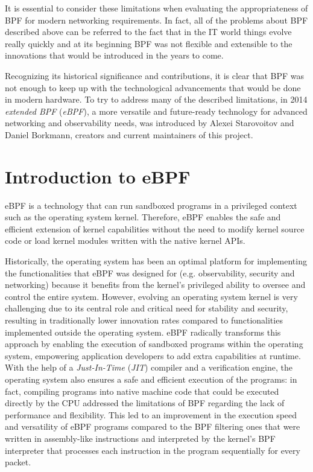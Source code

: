 It is essential to consider these limitations when evaluating the appropriateness of  BPF for modern networking requirements. 
In fact, all of the problems about BPF described above can be referred to the fact that in the IT world things evolve really quickly and at its beginning BPF was not flexible and extensible to the innovations that would be introduced in the years to come.

Recognizing its historical significance and contributions, it is clear that BPF was not enough to keep up with the technological advancements that would be done in modern hardware.
To try to address many of the described limitations, in 2014 \textit{extended BPF} (\textit{eBPF}), a more versatile and future-ready technology for advanced networking and observability needs, was introduced by Alexei Starovoitov and Daniel Borkmann, creators and current maintainers of this project.

\section{Introduction to eBPF}

eBPF is a technology that can run sandboxed programs in a privileged context such as the operating system kernel.
Therefore, eBPF enables the safe and efficient extension of kernel capabilities without the need to modify kernel source code or load kernel modules written with the native kernel APIs.

Historically, the operating system has been an optimal platform for implementing the functionalities that eBPF was designed for (e.g. observability, security and networking) because it benefits from the kernel's privileged ability to oversee and control the entire system.
However, evolving an operating system kernel is very challenging due to its central role and critical need for stability and security, resulting in traditionally lower innovation rates compared to functionalities implemented outside the operating system.
eBPF radically transforms this approach by enabling the execution of sandboxed programs within the operating system, empowering application developers to add extra capabilities at runtime. 
With the help of a \textit{Just-In-Time} (\textit{JIT}) compiler and a verification engine, the operating system also ensures a safe and efficient execution of the programs: in fact, compiling programs into native machine code that could be executed directly by the CPU addressed the limitations of BPF regarding the lack of performance and flexibility.
This led to an improvement in the execution speed and versatility of eBPF programs compared to the BPF filtering ones that were written in assembly-like instructions and interpreted by the kernel's BPF interpreter that processes each instruction in the program sequentially for every packet.

